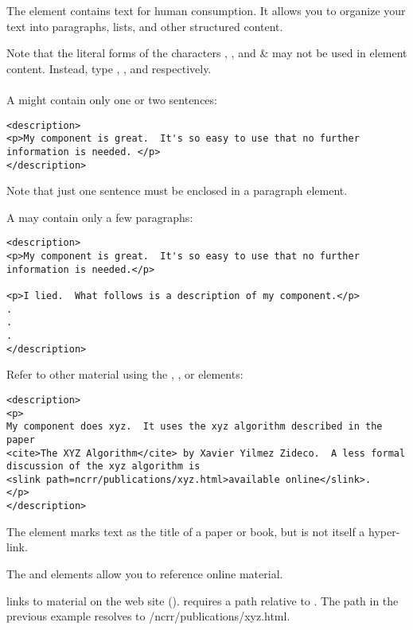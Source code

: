 \documentclass[11pt]{article}
\begin{document}
The  element contains text for human consumption.
It allows you to organize your text into paragraphs, lists, and
other structured content.

Note that the literal forms of the characters \la, \ra, and \& may not be
used in element content.  Instead, type ,
, and  respectively.

\paragraph{\SUBSUBSECcommonUsage}
\label{\SUBSUBSECcommonUsage}

A  might contain only one or two sentences:

\begin{verbatim}
<description>
<p>My component is great.  It's so easy to use that no further
information is needed. </p>
</description>
\end{verbatim}

Note that just one sentence must be enclosed in a paragraph element.

A  may contain only a few paragraphs:

\begin{verbatim}
<description>
<p>My component is great.  It's so easy to use that no further
information is needed.</p>

<p>I lied.  What follows is a description of my component.</p>
.
.
.
</description>
\end{verbatim}

Refer to other material using the , ,
or  elements:

\begin{verbatim}
<description>
<p>
My component does xyz.  It uses the xyz algorithm described in the paper
<cite>The XYZ Algorithm</cite> by Xavier Yilmez Zideco.  A less formal
discussion of the xyz algorithm is
<slink path=ncrr/publications/xyz.html>available online</slink>. 
</p>
</description>
\end{verbatim}

The  element marks text as the title of a paper or
book, but is not itself a hyper-link.

The  and  elements allow you to reference
online material.

 links to material on the \sci{} 
web site (\sciurl).   requires a path 
relative to \sciurl.  The path in the previous example resolves to
\sciurl{}/ncrr/publications/xyz.html.
\end{document}
